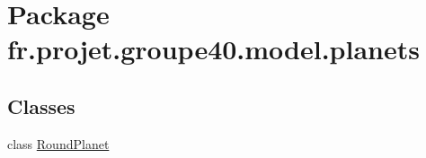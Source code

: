 \hypertarget{namespacefr_1_1projet_1_1groupe40_1_1model_1_1planets}{}\section{Package fr.\+projet.\+groupe40.\+model.\+planets}
\label{namespacefr_1_1projet_1_1groupe40_1_1model_1_1planets}
\subsection*{Classes}
\begin{DoxyCompactItemize}
\item 
class \hyperlink{classfr_1_1projet_1_1groupe40_1_1model_1_1planets_1_1_round_planet}{Round\+Planet}
\end{DoxyCompactItemize}
